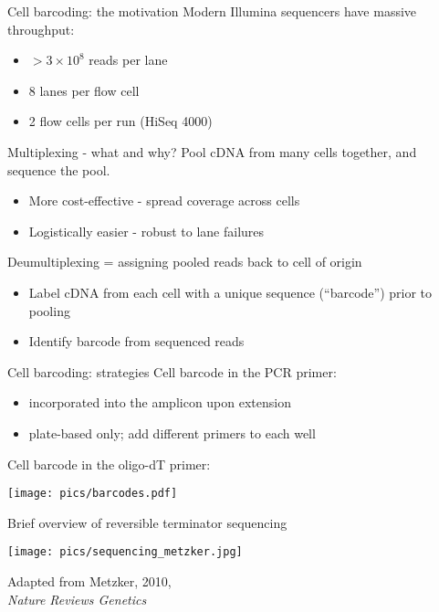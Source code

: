\documentclass{beamer}
\begin{document}
\begin{frame}{Cell barcoding: the motivation}
Modern Illumina sequencers have massive throughput:
\begin{itemize}
\item $> 3 \times 10^8$ reads per lane 
\item 8 lanes per flow cell
\item 2 flow cells per run (HiSeq 4000)
\end{itemize}
\pause
\begin{exampleblock}{Multiplexing - what and why?}
Pool cDNA from many cells together, and sequence the pool.
\begin{itemize}
\item More cost-effective - spread coverage across cells
\item Logistically easier - robust to lane failures
\end{itemize}
\end{exampleblock}
\pause
Deumultiplexing = assigning pooled reads back to cell of origin
\begin{itemize}
\item Label cDNA from each cell with a unique sequence (``barcode'') prior to pooling
\item Identify barcode from sequenced reads
\end{itemize}
\end{frame}

\begin{frame}{Cell barcoding: strategies}
Cell barcode in the PCR primer:
\begin{itemize}
\item incorporated into the amplicon upon extension 
\item plate-based only; add different primers to each well
\end{itemize}
Cell barcode in the oligo-dT primer:
\begin{center}
\texttt{[image: pics/barcodes.pdf]}
\end{center}
\end{frame}

\begin{frame}{Brief overview of reversible terminator sequencing}
\begin{minipage}{0.69\textwidth}
\texttt{[image: pics/sequencing\_metzker.jpg]} 
\end{minipage}
\begin{minipage}{0.29\textwidth}
{\tiny Adapted from Metzker, 2010, \\\textit{Nature Reviews Genetics}}
\end{minipage}
\end{frame}
\end{document}
